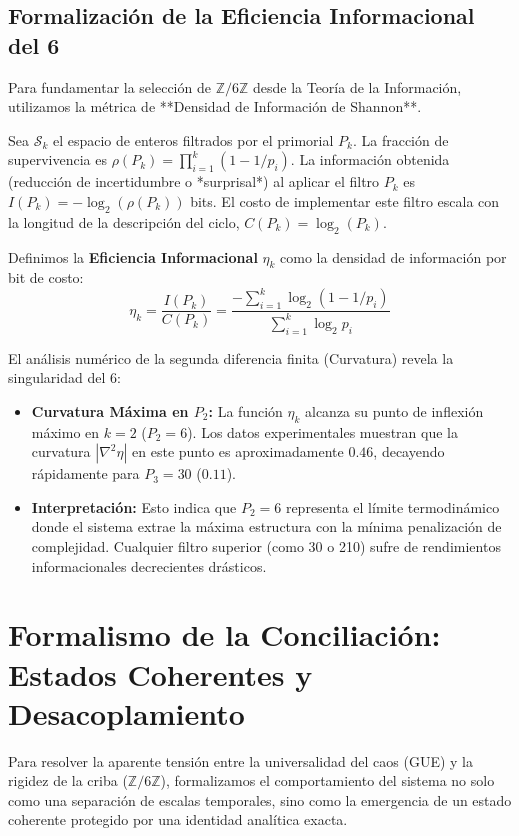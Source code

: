 \documentclass[12pt, a4paper]{article}
\theoremstyle{plain}
\theoremstyle{definition}
\newcommand{\Z}{\mathbb{Z}}
\begin{document}
\subsection{Formalización de la Eficiencia Informacional del 6}

Para fundamentar la selección de $\Z/6\Z$ desde la Teoría de la Información, utilizamos la métrica de **Densidad de Información de Shannon**.

Sea $\mathcal{S}_k$ el espacio de enteros filtrados por el primorial $P_k$. La fracción de supervivencia es $\rho(P_k) = \prod_{i=1}^k (1 - 1/p_i)$.
La información obtenida (reducción de incertidumbre o *surprisal*) al aplicar el filtro $P_k$ es $I(P_k) = -\log_2(\rho(P_k))$ bits.
El costo de implementar este filtro escala con la longitud de la descripción del ciclo, $C(P_k) = \log_2(P_k)$.

Definimos la \textbf{Eficiencia Informacional} $\eta_k$ como la densidad de información por bit de costo:
\begin{equation}
    \eta_k = \frac{I(P_k)}{C(P_k)} = \frac{-\sum_{i=1}^k \log_2(1 - 1/p_i)}{\sum_{i=1}^k \log_2 p_i}
\end{equation}

El análisis numérico de la segunda diferencia finita (Curvatura) revela la singularidad del 6:
\begin{itemize}
    \item \textbf{Curvatura Máxima en $P_2$:} La función $\eta_k$ alcanza su punto de inflexión máximo en $k=2$ ($P_2=6$). Los datos experimentales muestran que la curvatura $|\nabla^2 \eta|$ en este punto es aproximadamente $0.46$, decayendo rápidamente para $P_3=30$ ($0.11$).
    \item \textbf{Interpretación:} Esto indica que $P_2=6$ representa el límite termodinámico donde el sistema extrae la máxima estructura con la mínima penalización de complejidad. Cualquier filtro superior (como 30 o 210) sufre de rendimientos informacionales decrecientes drásticos.
\end{itemize}

\section{Formalismo de la Conciliación: Estados Coherentes y Desacoplamiento}

Para resolver la aparente tensión entre la universalidad del caos (GUE) y la rigidez de la criba ($\Z/6\Z$), formalizamos el comportamiento del sistema no solo como una separación de escalas temporales, sino como la emergencia de un estado coherente protegido por una identidad analítica exacta.
\end{document}

